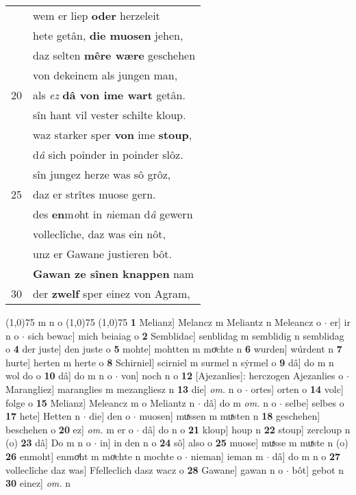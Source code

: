 \documentclass[8pt,a4paper,notitlepage]{article}
\begin{document}
\begin{table}[ht]
\begin{minipage}[t]{0.5\linewidth}
\begin{tabular}{rl}
 & wem er liep \textbf{oder} herzeleit\\ 
 & hete getân, \textbf{die muosen} jehen,\\ 
 & daz selten \textbf{mêre wære} geschehen\\ 
 & von dekeinem als jungen man,\\ 
20 & als \textit{ez} \textbf{dâ von ime wart} getân.\\ 
 & sîn hant vil vester schilte kloup.\\ 
 & waz starker sper \textbf{von} ime \textbf{stoup},\\ 
 & d\textit{â} sich poinder in poinder slôz.\\ 
 & sîn jungez herze was sô grôz,\\ 
25 & daz er strîtes muose gern.\\ 
 & des \textbf{en}m\textit{o}ht in \textit{n}ieman d\textit{â} gewern\\ 
 & volleclîche, daz was ein nôt,\\ 
 & unz er Gawane justieren bôt.\\ 
 & \textbf{Gawan ze sînen knappen} nam\\ 
30 & der \textbf{zwelf} sper einez von Agram,\\ 
\end{tabular}
\scriptsize
\line(1,0){75} \newline
m n o \newline
\line(1,0){75} \newline
\newline
\line(1,0){75} \newline
\textbf{1} Melianz] Melancz m Meliantz n Meleancz o  $\cdot$ er] ir n o  $\cdot$ sich bewac] mich beiaiag o \textbf{2} Semblidac] senblidag m semblidig n semblidag o \textbf{4} der juste] den juste o \textbf{5} mohte] mohtten m moͯchte n \textbf{6} wurden] wúrdent n \textbf{7} hurte] herten m herte o \textbf{8} Schirniel] scirniel m surmel n sẏrmel o \textbf{9} dâ] do m n wol do o \textbf{10} dâ] do m n o  $\cdot$ von] noch n o \textbf{12} [Ajezanlies]: herczogen Ajezanlies o  $\cdot$ Marangliez] maranglies m mezangliesz n \textbf{13} die] \textit{om.} n o  $\cdot$ ortes] orten o \textbf{14} volc] folge o \textbf{15} Melianz] Meleancz m o Meliantz n  $\cdot$ dâ] do m \textit{om.} n o  $\cdot$ selbe] selbes o \textbf{17} hete] Hetten n  $\cdot$ die] den o  $\cdot$ muosen] muͯssen m muͯsten n \textbf{18} geschehen] beschehen o \textbf{20} ez] \textit{om.} m er o  $\cdot$ dâ] do n o \textbf{21} kloup] houp n \textbf{22} stoup] zercloup n (o) \textbf{23} dâ] Do m n o  $\cdot$ in] in den n o \textbf{24} sô] also o \textbf{25} muose] muͯsse m muͯste n (o) \textbf{26} enmoht] enmoͯht m moͯchte n mochte o  $\cdot$ nieman] ieman m  $\cdot$ dâ] do m n o \textbf{27} volleclîche daz was] Ffelleclich dasz wacz o \textbf{28} Gawane] gawan n o  $\cdot$ bôt] gebot n \textbf{30} einez] \textit{om.} n \newline
\end{minipage}
\end{table}
\end{document}
